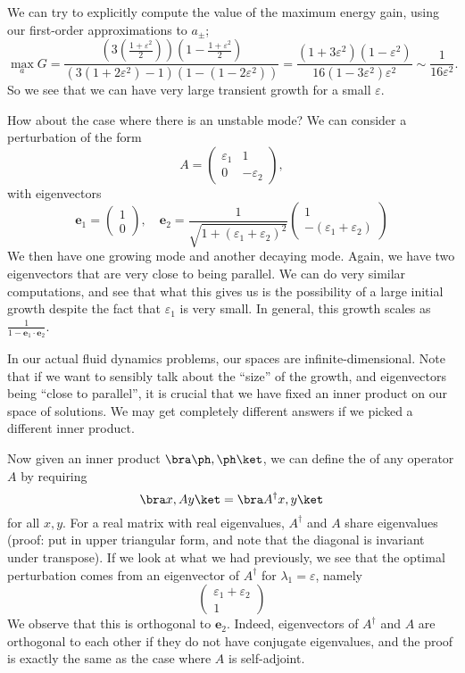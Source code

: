 \documentclass[a4paper]{article}
\begin{document}
We can try to explicitly compute the value of the maximum energy gain, using our first-order approximations to $a_{\pm}$;
\[
  \max_a G = \frac{\left(3 \left(\frac{1 + \varepsilon^2}{2}\right)\right)\left(1 - \frac{1 + \varepsilon^2}{2}\right)}{(3(1 + 2\varepsilon^2) - 1)(1 - (1 - 2 \varepsilon^2))} = \frac{(1 + 3 \varepsilon^2)(1 - \varepsilon^2)}{16(1 - 3 \varepsilon^2)\varepsilon^2} \sim \frac{1}{16 \varepsilon^2}.
\]
So we see that we can have very large transient growth for a small $\varepsilon$.

How about the case where there is an unstable mode? We can consider a perturbation of the form
\[
  A =
  \begin{pmatrix}
    \varepsilon_1 & 1\\
    0 & -\varepsilon_2
  \end{pmatrix},
\]
with eigenvectors
\[
  \mathbf{e}_1 =
  \begin{pmatrix}
    1 \\0
  \end{pmatrix},\quad
  \mathbf{e}_2 = \frac{1}{\sqrt{1 + (\varepsilon_1 + \varepsilon_2)^2}}
  \begin{pmatrix}
    1\\
     -(\varepsilon_1 + \varepsilon_2)
  \end{pmatrix}
\]
We then have one growing mode and another decaying mode. Again, we have two eigenvectors that are very close to being parallel. We can do very similar computations, and see that what this gives us is the possibility of a large initial growth despite the fact that $\varepsilon_1$ is very small. In general, this growth scales as $\frac{1}{1 - \mathbf{e}_1 \cdot \mathbf{e}_2}$.

In our actual fluid dynamics problems, our spaces are infinite-dimensional. Note that if we want to sensibly talk about the ``size'' of the growth, and eigenvectors being ``close to parallel'', it is crucial that we have fixed an inner product on our space of solutions. We may get completely different answers if we picked a different inner product.

Now given an inner product $\bra \ph, \ph\ket$, we can define the  of any operator $A$ by requiring
\[
  \bra x, Ay\ket = \bra A^\dagger x, y\ket
\]
for all $x, y$. For a real matrix with real eigenvalues, $A^\dagger$ and $A$ share eigenvalues (proof: put in upper triangular form, and note that the diagonal is invariant under transpose). If we look at what we had previously, we see that the optimal perturbation comes from an eigenvector of $A^\dagger$ for $\lambda_1 = \varepsilon$, namely
\[
  \begin{pmatrix}
    \varepsilon_1 + \varepsilon_2 \\ 1
  \end{pmatrix}
\]
We observe that this is orthogonal to $\mathbf{e}_2$. Indeed, eigenvectors of $A^\dagger$ and $A$ are orthogonal to each other if they do not have conjugate eigenvalues, and the proof is exactly the same as the case where $A$ is self-adjoint.
\end{document}
